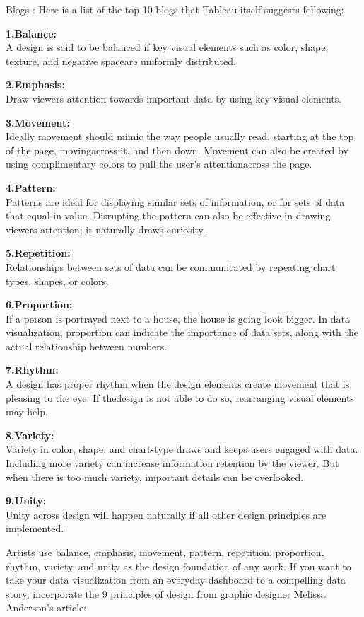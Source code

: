 \documentclass[]{book}
\theoremstyle{definition}
\theoremstyle{definition}
\theoremstyle{definition}
\theoremstyle{remark}
\begin{document}
Blogs : Here is a list of the top 10 blogs that Tableau itself suggests
following:

\textbf{1.Balance:}\\
A design is said to be balanced if key visual elements such as color,
shape, texture, and negative spaceare uniformly distributed.

\textbf{2.Emphasis:}\\
Draw viewers attention towards important data by using key visual
elements.

\textbf{3.Movement:}\\
Ideally movement should mimic the way people usually read, starting at
the top of the page, movingacross it, and then down. Movement can also
be created by using complimentary colors to pull the user's
attentionacross the page.

\textbf{4.Pattern:}\\
Patterns are ideal for displaying similar sets of information, or for
sets of data that equal in value. Disrupting the pattern can also be
effective in drawing viewers attention; it naturally draws curiosity.

\textbf{5.Repetition:}\\
Relationships between sets of data can be communicated by repeating
chart types, shapes, or colors.

\textbf{6.Proportion:}\\
If a person is portrayed next to a house, the house is going look
bigger. In data visualization, proportion can indicate the importance of
data sets, along with the actual relationship between numbers.

\textbf{7.Rhythm:}\\
A design has proper rhythm when the design elements create movement that
is pleasing to the eye. If thedesign is not able to do so, rearranging
visual elements may help.

\textbf{8.Variety:}\\
Variety in color, shape, and chart-type draws and keeps users engaged
with data. Including more variety can increase information retention by
the viewer. But when there is too much variety, important details can be
overlooked.

\textbf{9.Unity:}\\
Unity across design will happen naturally if all other design principles
are implemented.

Artists use balance, emphasis, movement, pattern, repetition,
proportion, rhythm, variety, and unity as the design foundation of any
work. If you want to take your data visualization from an everyday
dashboard to a compelling data story, incorporate the 9 principles of
design from graphic designer Melissa Anderson's
article:\citep{design_principles}
\end{document}
